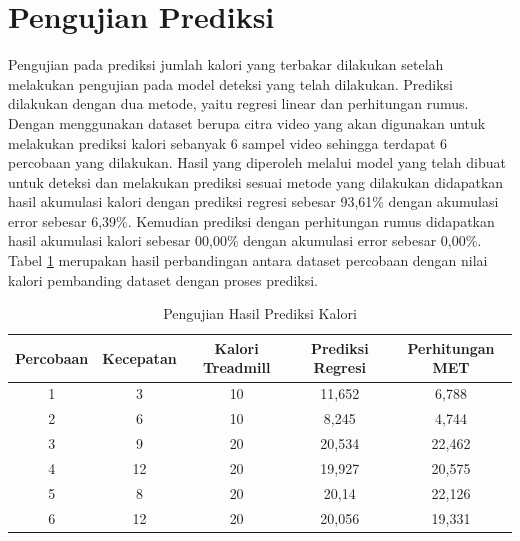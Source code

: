 \section{Pengujian Prediksi}
\label{sec:PengujianPrediksi}

Pengujian pada prediksi jumlah kalori yang terbakar dilakukan setelah melakukan pengujian pada model deteksi yang telah dilakukan. Prediksi dilakukan dengan dua metode, yaitu regresi linear dan perhitungan rumus. Dengan menggunakan dataset berupa citra video yang akan digunakan untuk melakukan prediksi kalori sebanyak 6 sampel video sehingga terdapat 6 percobaan yang dilakukan. Hasil yang diperoleh melalui model yang telah dibuat untuk deteksi dan melakukan prediksi sesuai metode yang dilakukan didapatkan hasil akumulasi kalori dengan prediksi regresi sebesar 93,61\% dengan akumulasi error sebesar 6,39\%. Kemudian prediksi dengan perhitungan rumus didapatkan hasil akumulasi kalori sebesar 00,00\% dengan akumulasi error sebesar 0,00\%. Tabel \ref{tb:PengujianPrediksi} merupakan hasil perbandingan antara dataset percobaan dengan nilai kalori pembanding dataset dengan proses prediksi.

\begin{longtable}{|c|c|c|c|c|}
  \caption{Pengujian Hasil Prediksi Kalori}
  \label{tb:PengujianPrediksi}                                   \\
  \hline
  \rowcolor[HTML]{C0C0C0}
  \textbf{Percobaan} & \textbf{Kecepatan} & \textbf{Kalori Treadmill} & \textbf{Prediksi Regresi} & \textbf{Perhitungan MET} \\
  \hline
  1   & 3     & 10    & 11,652    & 6,788   \\
  \hline
  2   & 6     & 10    & 8,245     & 4,744   \\
  \hline
  3   & 9     & 20    & 20,534    & 22,462   \\
  \hline
  4   & 12    & 20    & 19,927    & 20,575   \\
  \hline
  5   & 8     & 20    & 20,14     & 22,126   \\
  \hline
  6   & 12    & 20    & 20,056    & 19,331   \\
  \hline
\end{longtable}